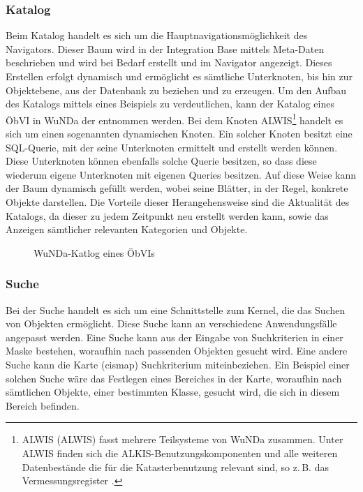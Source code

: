\subsubsection{Katalog} \label{subsubsec:katalog}
Beim Katalog handelt es sich um die Hauptnavigationsmöglichkeit des Navigators.
Dieser Baum wird in der Integration Base mittels Meta-Daten beschrieben und wird bei Bedarf erstellt und im Navigator angezeigt.
Dieses Erstellen erfolgt dynamisch und ermöglicht es sämtliche Unterknoten, bis hin zur Objektebene, aus der Datenbank zu beziehen und zu erzeugen.
Um den Aufbau des Katalogs mittels eines Beispiels zu verdeutlichen, kann der Katalog eines \ac{ÖbVI} in \ac{WuNDa} der  entnommen werden.
Bei dem Knoten \acs{ALWIS}\footnote{\acs{ALWIS} (\acl{ALWIS}) fasst mehrere Teilsysteme von \ac{WuNDa} zusammen. Unter \acs{ALWIS} finden sich die ALKIS-Benutzungskomponenten und alle weiteren Datenbestände die für die Katasterbenutzung relevant sind, so z.\,B. das Vermessungsregister \autocite[vgl.][]{wupp-wunda-oebvi}.} handelt es sich um einen sogenannten dynamischen Knoten.
Ein solcher Knoten besitzt eine SQL-Querie, mit der seine Unterknoten ermittelt und erstellt werden können.
Diese Unterknoten können ebenfalls solche Querie besitzen, so dass diese wiederum eigene Unterknoten mit eigenen Queries besitzen.
Auf diese Weise kann der Baum dynamisch gefüllt werden, wobei seine Blätter, in der Regel, konkrete Objekte darstellen.
Die Vorteile dieser Herangehensweise sind die Aktualität des Katalogs, da dieser zu jedem Zeitpunkt neu erstellt werden kann, sowie das Anzeigen sämtlicher relevanten Kategorien und Objekte.

\begin{figure}[htb]
	\centering
	\caption{WuNDa-Katlog eines ÖbVIs}
	\label{fig:katlog-oebvi}
\end{figure}

\subsubsection{Suche}
Bei der Suche handelt es sich um eine Schnittstelle zum Kernel, die das Suchen von Objekten ermöglicht.
Diese Suche kann an verschiedene Anwendungsfälle angepasst werden.
Eine Suche kann aus der Eingabe von Suchkriterien in einer Maske bestehen, woraufhin nach passenden Objekten gesucht wird.
Eine andere Suche kann die Karte (cismap) Suchkriterium miteinbeziehen. Ein Beispiel einer solchen Suche wäre das Festlegen eines Bereiches in der Karte, woraufhin nach sämtlichen Objekte, einer bestimmten Klasse, gesucht wird, die sich in diesem Bereich befinden.

